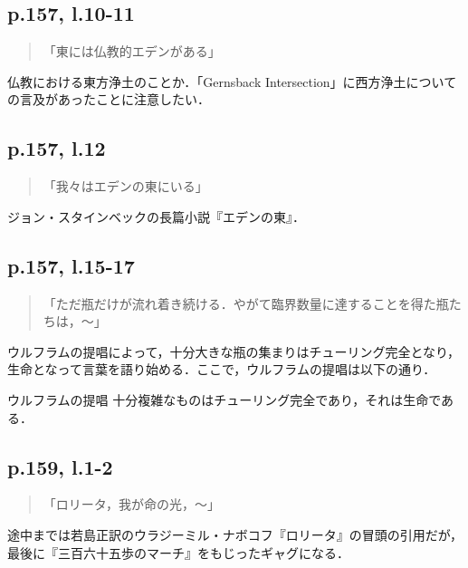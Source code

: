 \documentclass[10pt, a5paper, twoside]{ltjsarticle}
\begin{document}
        \subsection{p.157, l.10-11}

            \begin{quote}
                「東には仏教的エデンがある」
            \end{quote}

            仏教における東方浄土のことか．「Gernsback Intersection」に西方浄土についての言及があったことに注意したい．

        \subsection{p.157, l.12}

            \begin{quote}
                「我々はエデンの東にいる」
            \end{quote}

            ジョン・スタインベックの長篇小説『エデンの東』．

        \subsection{p.157, l.15-17}

            \begin{quote}
                「ただ瓶だけが流れ着き続ける．やがて臨界数量に達することを得た瓶たちは，〜」
            \end{quote}

            ウルフラムの提唱によって，十分大きな瓶の集まりはチューリング完全となり，生命となって言葉を語り始める．ここで，ウルフラムの提唱は以下の通り．

            \begin{ths}{ウルフラムの提唱}{}
                十分複雑なものはチューリング完全であり，それは生命である．
            \end{ths}

        \subsection{p.159, l.1-2}

            \begin{quote}
                「ロリータ，我が命の光，〜」
            \end{quote}

            途中までは若島正訳のウラジーミル・ナボコフ『ロリータ』\cite{lolita}の冒頭の引用だが，最後に『三百六十五歩のマーチ』をもじったギャグになる．
\end{document}
